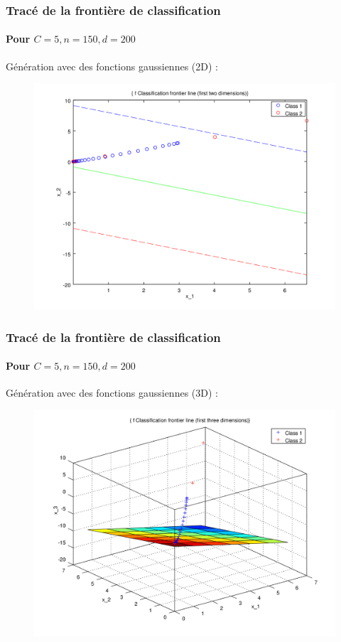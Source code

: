 \documentclass{beamer}
\begin{document}
\begin{frame}
\frametitle{Tracé de la frontière de classification}
\framesubtitle{Pour $C = 5, n = 150, d = 200$}

Génération avec des fonctions gaussiennes (2D) :

         \begin{figure}
         \centering
         \includegraphics[scale=0.4]{images/line5.png}
         \end{figure}

\end{frame}

\begin{frame}
\frametitle{Tracé de la frontière de classification}
\framesubtitle{Pour $C = 5, n = 150, d = 200$}

Génération avec des fonctions gaussiennes (3D) :

         \begin{figure}
         \centering
         \includegraphics[scale=0.4]{images/plane5.png}
         \end{figure}

\end{frame}
\end{document}
